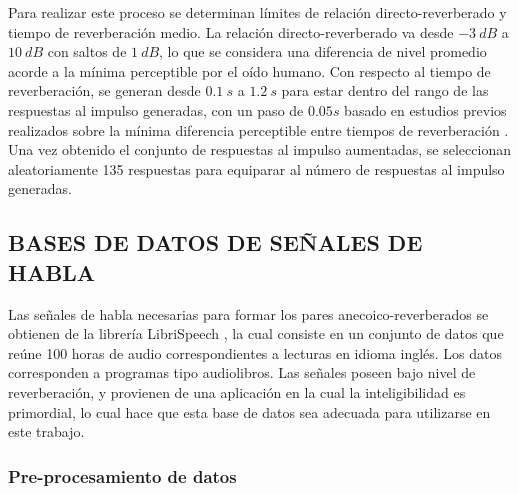 Para realizar este proceso se determinan límites de relación directo-reverberado y tiempo de reverberación medio. La relación directo-reverberado va desde $-3 \ dB$ a $10 \ dB$ con saltos de $1 \ dB$, lo que se considera una diferencia de nivel promedio acorde a la mínima perceptible por el oído humano. Con respecto al tiempo de reverberación, se generan desde $0.1 \ s$ a $1.2 \ s$ para estar dentro del rango de las respuestas al impulso generadas, con un paso de $0.05 s$ basado en estudios previos realizados sobre la mínima diferencia perceptible entre tiempos de reverberación \cite{aug_JND}. Una vez obtenido el conjunto de respuestas al impulso aumentadas, se seleccionan aleatoriamente 135 respuestas para equiparar al número de respuestas al impulso generadas. 

\subsection[Bases de datos de señales de habla]{BASES DE DATOS DE SEÑALES DE HABLA}

Las señales de habla necesarias para formar los pares anecoico-reverberados se obtienen de la librería LibriSpeech \cite{librispeech}, la cual consiste en un conjunto de datos que reúne 100 horas de audio correspondientes a lecturas en idioma inglés. Los datos corresponden a programas tipo audiolibros. Las señales poseen bajo nivel de reverberación, y provienen de una aplicación en la cual la inteligibilidad es primordial, lo cual hace que esta base de datos sea adecuada para utilizarse en este trabajo.

\subsubsection{Pre-procesamiento de datos}

